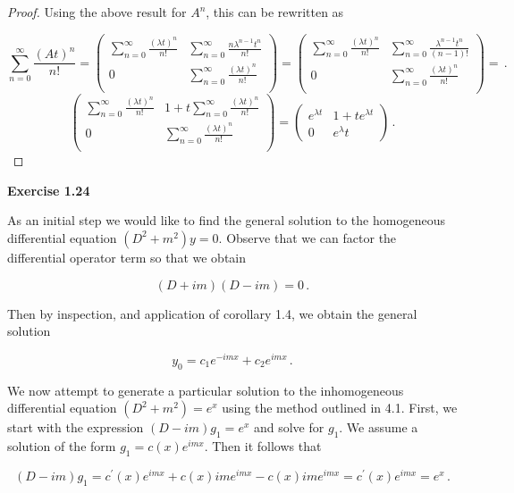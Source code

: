 \documentclass[a4paper]{article}
\numberwithin{equation}{section}
\begin{document}
\begin{description}
\begin{proof}
Using the above result for $A^n$, this can be rewritten as

$$\sum_{n=0}^{\infty} \frac{(At)^n}{n!} = \begin{pmatrix}
\sum_{n=0}^{\infty} \frac{(\lambda t)^n}{n!} & \sum_{n=0}^{\infty} \frac{n\lambda^{n-1} t^n}{n!} \\
0 & \sum_{n=0}^{\infty} \frac{(\lambda t)^n}{n!} \\
\end{pmatrix} = 
\begin{pmatrix}
\sum_{n=0}^{\infty} \frac{(\lambda t)^n}{n!} & \sum_{n=0}^{\infty} \frac{\lambda^{n-1} t^n}{(n-1)!} \\
0 & \sum_{n=0}^{\infty} \frac{(\lambda t)^n}{n!} \\
\end{pmatrix} = \,.$$
$$\begin{pmatrix}
\sum_{n=0}^{\infty} \frac{(\lambda t)^n}{n!} & 1+ t\sum_{n=0}^{\infty} \frac{(\lambda t)^n}{n!} \\
0 & \sum_{n=0}^{\infty} \frac{(\lambda t)^n}{n!} \\
\end{pmatrix} = \begin{pmatrix}
e^{{\lambda}t} & 1+te^{{\lambda}t} \\
0 & {e^{\lambda}t}
\end{pmatrix}\,.$$

\end{proof}

\item \textbf{Exercise 1.24}

\item As an initial step we would like to find the general solution to the homogeneous differential equation $(D^2 + m^2)y = 0$. Observe that we can factor the differential operator term so that we obtain

$$(D + im)(D - im) = 0\,.$$

Then by inspection, and application of corollary 1.4, we obtain the general solution

$$y_0 = c_1e^{-imx} + c_2e^{imx}\,.$$

We now attempt to generate a particular solution to the inhomogeneous differential equation $(D^2 + m^2) = e^x$ using the method outlined in 4.1. First, we start with the expression $(D - im)g_1 = e^x$ and solve for $g_1$. We assume a solution of the form $g_1 = c(x)e^{imx}$. Then it follows that

$$(D-im)g_1 = c^{\prime}(x)e^{imx} + c(x)ime^{imx} -c(x)ime^{imx} = c^{\prime}(x)e^{imx} = e^x\,.$$


\end{description}
\end{document}
